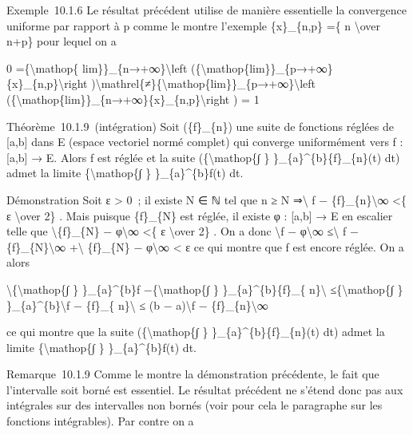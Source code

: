 \documentclass[]{article}
\begin{document}
Exemple~10.1.6 Le résultat précédent utilise de manière essentielle la
convergence uniforme par rapport à p comme le montre l'exemple
\{x\}\_\{n,p\} =\{ n \textbackslash{}over n+p\} pour lequel on a

0 =\{\textbackslash{}mathop\{ lim\}\}\_\{n→+∞\}\textbackslash{}left
(\{\textbackslash{}mathop\{lim\}\}\_\{p→+∞\}\{x\}\_\{n,p\}\textbackslash{}right
)\textbackslash{}mathrel\{≠\}\{\textbackslash{}mathop\{lim\}\}\_\{p→+∞\}\textbackslash{}left
(\{\textbackslash{}mathop\{lim\}\}\_\{n→+∞\}\{x\}\_\{n,p\}\textbackslash{}right
) = 1

Théorème~10.1.9~(intégration) Soit (\{f\}\_\{n\}) une suite de fonctions
réglées de {[}a,b{]} dans E (espace vectoriel normé complet) qui
converge uniformément vers f : {[}a,b{]} → E. Alors f est réglée et la
suite (\{\textbackslash{}mathop\{∫ \} \}\_\{a\}\^{}\{b\}\{f\}\_\{n\}(t)
dt) admet la limite \{\textbackslash{}mathop\{∫ \}
\}\_\{a\}\^{}\{b\}f(t) dt.

Démonstration Soit ε \textgreater{} 0~; il existe N ∈ ℕ tel que n ≥ N
⇒\textbackslash{}\textbar{} f − \{f\}\_\{n\}\textbackslash{}\textbar{}∞
\textless{}\{ ε \textbackslash{}over 2\} . Mais puisque \{f\}\_\{N\} est
réglée, il existe φ : {[}a,b{]} → E en escalier telle que
\textbackslash{}\textbar{}\{f\}\_\{N\} − φ\textbackslash{}\textbar{}∞
\textless{}\{ ε \textbackslash{}over 2\} . On a donc
\textbackslash{}\textbar{}f − φ\textbackslash{}\textbar{}∞
≤\textbackslash{}\textbar{} f − \{f\}\_\{N\}\textbackslash{}\textbar{}∞
+\textbackslash{}\textbar{} \{f\}\_\{N\} − φ\textbackslash{}\textbar{}∞
\textless{} ε ce qui montre que f est encore réglée. On a alors

\textbackslash{}\textbar{}\{\textbackslash{}mathop\{∫ \}
\}\_\{a\}\^{}\{b\}f −\{\textbackslash{}mathop\{∫ \}
\}\_\{a\}\^{}\{b\}\{f\}\_\{ n\}\textbackslash{}\textbar{}
≤\{\textbackslash{}mathop\{∫ \}
\}\_\{a\}\^{}\{b\}\textbackslash{}\textbar{}f − \{f\}\_\{
n\}\textbackslash{}\textbar{} ≤ (b − a)\textbackslash{}\textbar{}f −
\{f\}\_\{n\}\textbackslash{}\textbar{}∞

ce qui montre que la suite (\{\textbackslash{}mathop\{∫ \}
\}\_\{a\}\^{}\{b\}\{f\}\_\{n\}(t) dt) admet la limite
\{\textbackslash{}mathop\{∫ \} \}\_\{a\}\^{}\{b\}f(t) dt.

Remarque~10.1.9 Comme le montre la démonstration précédente, le fait que
l'intervalle soit borné est essentiel. Le résultat précédent ne s'étend
donc pas aux intégrales sur des intervalles non bornés (voir pour cela
le paragraphe sur les fonctions intégrables). Par contre on a
\end{document}
